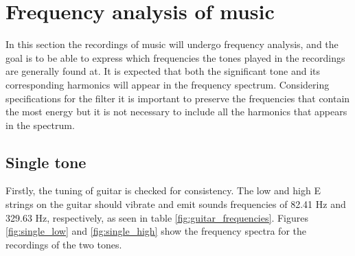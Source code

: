 \section{Frequency analysis of music}
In this section the recordings of music will undergo frequency analysis, and the goal is to be able to express which frequencies the tones played in the recordings are generally found at. It is expected that both the significant tone and its corresponding harmonics will appear in the frequency spectrum. Considering specifications for the filter it is important to preserve the frequencies that contain the most energy but it is not necessary to include all the harmonics that appears in the spectrum.     
\subsection{Single tone}\label{sec:single}
Firstly, the tuning of guitar is checked for consistency. The low and high E strings on the guitar should vibrate and emit sounds frequencies of 82.41 Hz and 329.63 Hz, respectively, as seen in table \ref{fig:guitar_frequencies}. Figures \ref{fig:single_low} and \ref{fig:single_high} show the frequency spectra for the recordings of the two tones.
